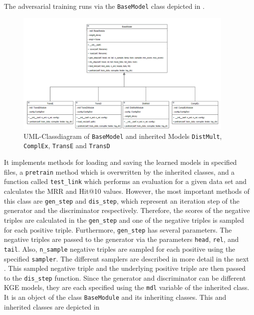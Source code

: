 The adversarial training runs via the \texttt{BaseModel} class depicted in .
\begin{figure}[t]
  \centering
    \includegraphics[width=0.95\textwidth]{figures/BaseModel.png}
  \caption{\ac{UML}-Classdiagram of \texttt{BaseModel} and inherited Models  \texttt{DistMult},  \texttt{ComplEx},  \texttt{TransE} and  \texttt{TransD}}
  \label{fig:basemodel_classdiagram}
\end{figure}
It implements methods for loading and saving the learned models in specified files, a \texttt{pretrain} method which is overwritten by the inherited classes, and a function called \texttt{test\_link} which performs an evaluation for a given data set and calculates the MRR and Hit@10 values.
However, the most important methods of this class are \texttt{gen\_step} and \texttt{dis\_step}, which represent an iteration step of the generator and the discriminator respectively.
Therefore, the scores of the negative triples are calculated in the \texttt{gen\_step} and one of the negative triples is sampled for each positive triple.
Furthermore, \texttt{gen\_step} has several parameters.
The negative triples are passed to the generator via the parameters \texttt{head}, \texttt{rel}, and \texttt{tail}.
Also, \texttt{n\_sample} negative triples are sampled for each positive using the specified \texttt{sampler}.
The different samplers are described in more detail in the next .
This sampled negative triple and the underlying positive triple are then passed to the \texttt{dis\_step} function.
Since the generator and discriminator can be different KGE models, they are each specified using the \texttt{mdl} variable of the inherited class.
It is an object of the class \texttt{BaseModule} and its inheriting classes.
This and inherited classes are depicted in 

